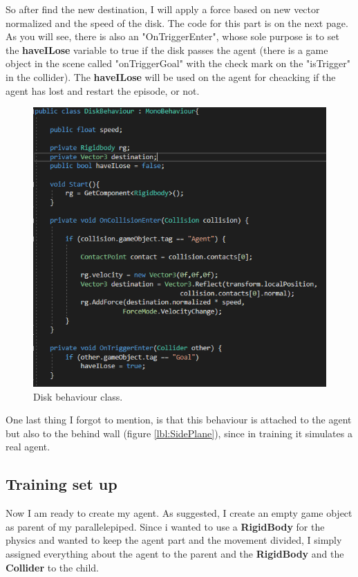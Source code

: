\documentclass[12pt]{article}
\begin{document}
	\noindent
	So after find the new destination, I will apply a force based on new vector normalized and the speed of the disk.
	The code for this part is on the next page. As you will see, there is also an "OnTriggerEnter", whose sole purpose is to set the \textbf{haveILose} variable to true if the disk passes the agent (there is a game object in the scene called "onTriggerGoal" with the check mark on the "isTrigger" in the collider). The  \textbf{haveILose} will be used on the agent for cheacking if the agent has lost and restart the episode, or not.
	
	\newpage
	
	\begin{figure}[hbt!]
		\centering
		\includegraphics[width= 1
		\textwidth]{images/DiskBehaviour1.png}
		\caption{Disk behaviour class.}
		\label{lbl:reflect}
	\end{figure} 
	
	\noindent
	One last thing I forgot to mention, is that this behaviour is attached to the agent but also to the behind wall (figure \ref{lbl:SidePlane}), since in training it simulates a real agent.
	
	\subsection{Training set up}
	Now I am ready to create my agent. As suggested, I create an empty game object as parent of my parallelepiped. Since i wanted to use a \textbf{RigidBody} for the physics and wanted to keep the agent part and the movement divided,  I simply assigned everything about the agent to the parent and the \textbf{RigidBody} and the \textbf{Collider} to the child.  
	
\end{document}
